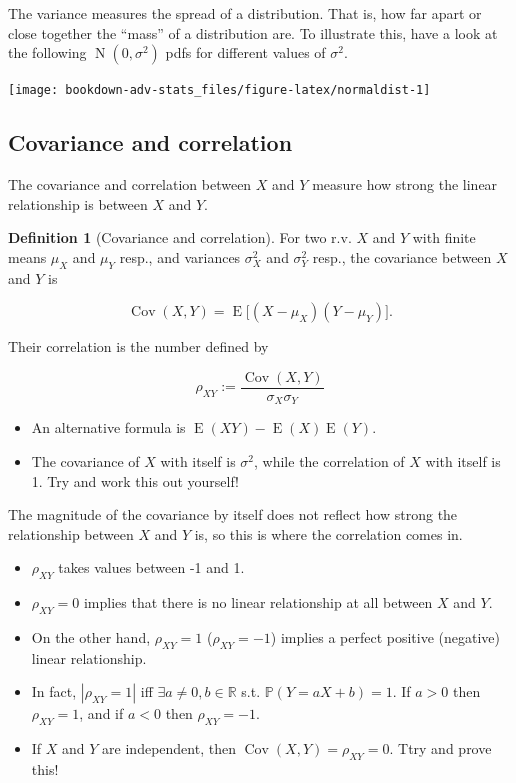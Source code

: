 \documentclass[
]{book}
\providecommand{\tightlist}{%
  \setlength{\itemsep}{0pt}\setlength{\parskip}{0pt}}
\DeclareMathOperator{\E}{E}
\DeclareMathOperator{\Cov}{Cov}
\DeclareMathOperator{\N}{N}
\newcommand{\bbR}{\mathbb{R}}
\newcommand{\bbP}{\mathbb{P}}
\theoremstyle{definition}
\newtheorem{definition}{Definition}[chapter]
\theoremstyle{definition}
\theoremstyle{definition}
\theoremstyle{definition}
\theoremstyle{remark}
\begin{document}
The variance measures the spread of a distribution. That is, how far apart or close together the ``mass'' of a distribution are.
To illustrate this, have a look at the following \(\N(0,\sigma^2)\) pdfs for different values of \(\sigma^2\).

\begin{center}\texttt{[image: bookdown-adv-stats\_files/figure-latex/normaldist-1]} \end{center}

\hypertarget{covariance-and-correlation}{%
\subsection{Covariance and correlation}\label{covariance-and-correlation}}

The covariance and correlation between \(X\) and \(Y\) measure how strong the linear relationship is between \(X\) and \(Y\).

\begin{definition}[Covariance and correlation]
For two r.v. \(X\) and \(Y\) with finite means \(\mu_X\) and \(\mu_Y\) resp., and variances \(\sigma^2_X\) and \(\sigma^2_Y\) resp., the covariance between \(X\) and \(Y\) is

\[
\Cov(X,Y) = \E\big[(X-\mu_X)(Y-\mu_Y) \big].
\]

Their correlation is the number defined by

\[
\rho_{XY} :=  \frac{\Cov(X,Y)}{\sigma_X\sigma_Y}
\]
\end{definition}

\begin{itemize}
\tightlist
\item
  An alternative formula is \(\E(XY) -\E(X)\E(Y)\).
\item
  The covariance of \(X\) with itself is \(\sigma^2\), while the correlation of \(X\) with itself is 1. Try and work this out yourself!
\end{itemize}

The magnitude of the covariance by itself does not reflect how strong the relationship between \(X\) and \(Y\) is, so this is where the correlation comes in.

\begin{itemize}
\tightlist
\item
  \(\rho_{XY}\) takes values between -1 and 1.
\item
  \(\rho_{XY}=0\) implies that there is no linear relationship at all between \(X\) and \(Y\).
\item
  On the other hand, \(\rho_{XY}=1\) (\(\rho_{XY}=-1\)) implies a perfect positive (negative) linear relationship.
\item
  In fact, \(|\rho_{XY}=1|\) iff \(\exists a\neq 0,b\in\bbR\) s.t. \(\bbP(Y=aX+b)=1\). If \(a>0\) then \(\rho_{XY}=1\), and if \(a<0\) then \(\rho_{XY}=-1\).
\item
  If \(X\) and \(Y\) are independent, then \(\Cov(X,Y) =\rho_{XY}=0\). Ttry and prove this!
\end{itemize}
\end{document}
